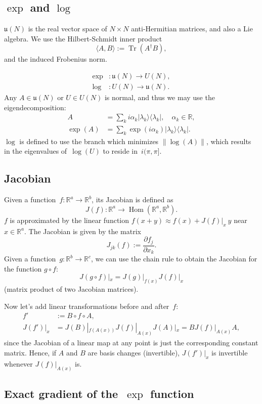\documentclass[aps,pra,12pt,showpacs,showkeys,nofootinbib,superscriptaddress,longbibliography]{revtex4}
\newcommand{\ketbra}[2]{\mbox{$|#1\rangle\langle #2|$}}
\newcommand{\inprod}[2]{\mbox{$\langle #1, #2\rangle$}}
\DeclareMathOperator{\Tr}{Tr}
\DeclareMathOperator{\Hom}{Hom} %
\newcommand{\R}{{\mathbb R}}  %
\newcommand{\mf}[1]{\mathfrak{#1}}
\newcommand{\pde}[2]{\frac{\partial #1}{\partial #2}}
\newcommand{\be}{\begin{equation}}
\newcommand{\ee}{\end{equation}}
\begin{document}
\subsection{$\exp$ and $\log$}
$\mf{u}(N)$ is the real vector space of $N \times N$ anti-Hermitian
matrices, and also a Lie algebra. We use the Hilbert-Schmidt inner
product
\be
\inprod{A}{B} := \Tr(A^\dagger B),
\ee
and the induced Frobenius norm.

\begin{align*}
\exp &: \mf{u}(N) \to U(N),\\
\log &: U(N) \to \mf{u}(N).
\end{align*}
Any $A \in \mf{u}(N)$ or $U \in U(N)$ is normal, and thus we may use
the eigendecomposition:
\begin{align*}
A &= \sum_k i \alpha_k \ketbra{\lambda_k}{\lambda_k}, \quad \alpha_k \in \R,\\
\exp(A) &= \sum_k \exp(i \alpha_k) \ketbra{\lambda_k}{\lambda_k}.
\end{align*}
$\log$ is defined to use the branch which minimizes $\|\log(A)\|$, which
results in the eigenvalues of~$\log(U)$ to reside in~$i (\pi, \pi]$.



\subsection{Jacobian}
Given a function~$f: \R^a \to \R^b$, its Jacobian is defined as
\be
J(f): \R^a \to \Hom(\R^a, \R^b).
\ee
$f$ is approximated by the
linear function
$f(x+y) \approx f(x) + J(f)|_x \: y$
near~$x \in \R^a$.
The Jacobian is given by the matrix
\be
J_{jk}(f) := \pde{f_j}{x_k}.
\ee
Given a function~$g: \R^b \to \R^c$, we can use the chain rule to
obtain the Jacobian for the function $g \circ f$:
\be
J(g \circ f)|_{x} = J(g)|_{f(x)} J(f)|_{x}
\ee
(matrix product of two Jacobian matrices).

Now let's add linear transformations before and after~$f$:
\begin{align*}
f' &:= B \circ f \circ A,\\
J(f')|_x &= J(B)|_{f(A(x))} J(f)|_{A(x)} J(A)|_{x} = B J(f)|_{A(x)} A,
\end{align*}
since the Jacobian of a linear map at any point is just the corresponding constant matrix.
Hence, if $A$ and $B$ are basis changes (invertible), $J(f')|_x$ is
invertible whenever $J(f)|_{A(x)}$ is.


\subsection{Exact gradient of the~$\exp$ function}
\end{document}
